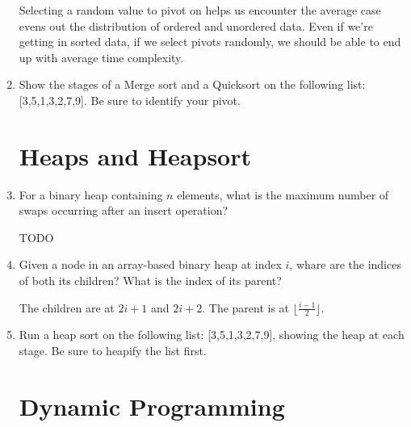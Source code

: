 \documentclass[11pt]{article}
\newenvironment{answer}{\large\lstset{basicstyle=\large}\color{white}}{}
\newenvironment{answer}{\large\lstset{basicstyle=\large}\color{red}}{}
\begin{document}
\begin{enumerate}
\begin{answer}
      Selecting a random value to pivot on helps us encounter the average case
      evens out the distribution of ordered and unordered data. Even if we're
      getting in sorted data, if we select pivots randomly, we should be able
      to end up with average time complexity.
      \end{answer}

\item Show the stages of a Merge sort and a Quicksort on the following list:
      [3,5,1,3,2,7,9]. Be sure to identify your pivot.

    \begin{answer}
    \end{answer}

\section*{Heaps and Heapsort}

\item For a binary heap containing $n$ elements, what is the maximum number of
      swaps occurring after an insert operation?

    \begin{answer}
    \Huge TODO
    \end{answer}

\item Given a node in an array-based binary heap at index $i$, whare are the
      indices of both its children? What is the index of its parent?

    \begin{answer}
    The children are at $2i+1$ and $2i+2$. The parent is at
    $\lfloor\frac{i-1}{2}\rfloor$.

    \end{answer}

\item Run a heap sort on the following list: [3,5,1,3,2,7,9], showing the heap
      at each stage. Be sure to heapify the list first.

    \begin{answer}
    \vspace{3.5in}
    \end{answer}

\section*{Dynamic Programming}


\end{enumerate}
\end{document}
